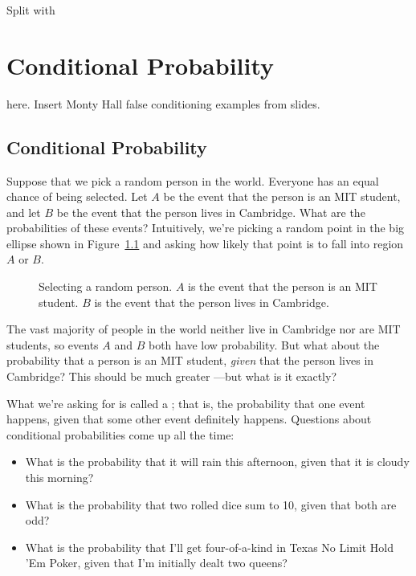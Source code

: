 \begin{problems}
\classproblems
{}

\homeworkproblems
{}

\end{problems}


\begin{editingnotes}
Split with \chapter{Conditional Probability}\label{chap:cond_prob}
here.  Insert Monty Hall false conditioning examples from slides.
\end{editingnotes}

\section{Conditional Probability}\label{cond_prob_sec}

Suppose that we pick a random person in the world.  Everyone has an
equal chance of being selected.  Let $A$ be the event that the person
is an MIT student, and let $B$ be the event that the person lives in
Cambridge.  What are the probabilities of these events?  Intuitively,
we're picking a random point in the big ellipse shown in
Figure~\ref{fig:15B1} and asking how likely that point is to fall into
region $A$ or $B$.

\begin{figure}[h]


\caption{Selecting a random person.  $A$ is the event that the person
  is an MIT student.  $B$ is the event that the person lives in
  Cambridge.}

\label{fig:15B1}

\end{figure}

The vast majority of people in the world neither live in Cambridge nor
are MIT students, so events $A$ and $B$ both have low probability.
But what about the probability that a person is an MIT student,
\emph{given} that the person lives in Cambridge?  This should be
much greater ---but what is it exactly?

What we're asking for is called a ; that
is, the probability that one event happens, given that some other
event definitely happens.  Questions about conditional probabilities
come up all the time:
%
\begin{itemize}
\item What is the probability that it will rain this afternoon, given
that it is cloudy this morning?
\item What is the probability that two rolled dice sum to 10, given
that both are odd?
\item What is the probability that I'll get four-of-a-kind in Texas No
Limit Hold 'Em Poker, given that I'm initially dealt two queens?
\end{itemize}

